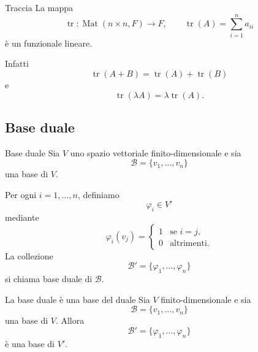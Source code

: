 \documentclass[a4paper]{article}
\begin{document}
\begin{snippetexample}{Traccia}
    La mappa
    \[
        \operatorname{tr}:\operatorname{Mat}(n\times n,F)\to F,
        \qquad
        \operatorname{tr}(A)=\sum_{i=1}^{n}a_{ii}
    \]
    è un funzionale lineare.

    Infatti
    \[
        \operatorname{tr}(A+B)=\operatorname{tr}(A)+\operatorname{tr}(B)
    \]
    e
    \[
        \operatorname{tr}(\lambda A)=\lambda\operatorname{tr}(A).
    \]
\end{snippetexample}

\subsection{Base duale}

\begin{snippetdefinition}{Base duale}
    Sia \(V\) uno spazio vettoriale finito-dimensionale e sia
    \[
        \mathcal{B}=\{v_1,\ldots,v_n\}
    \]
    una base di \(V\).

    Per ogni \(i=1,\ldots,n\), definiamo
    \[
        \varphi_i\in V'
    \]
    mediante
    \[
        \varphi_i(v_j)=
        \begin{cases}
            1 & \text{se } i=j,\\
            0 & \text{altrimenti}.
        \end{cases}
    \]
    La collezione
    \[
        \mathcal{B}'=\{\varphi_1,\ldots,\varphi_n\}
    \]
    si chiama base duale di \(\mathcal{B}\).
\end{snippetdefinition}

\begin{snippetproposition}{La base duale è una base del duale}
    Sia \(V\) finito-dimensionale e sia
    \[
        \mathcal{B}=\{v_1,\ldots,v_n\}
    \]
    una base di \(V\). Allora
    \[
        \mathcal{B}'=\{\varphi_1,\ldots,\varphi_n\}
    \]
    è una base di \(V'\).
\end{snippetproposition}
\end{document}
